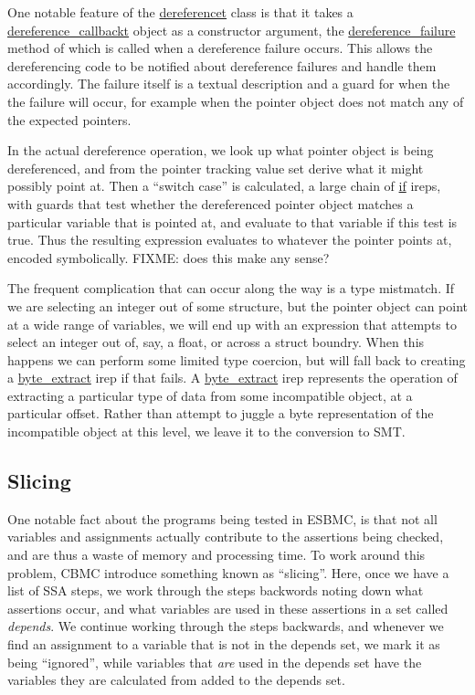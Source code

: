 \documentclass{article}
\begin{document}
One notable feature of the \url{dereferencet} class is that it takes a
\url{dereference_callbackt} object as a constructor argument, the
\url{dereference_failure} method of which is called when a dereference
failure occurs. This allows the dereferencing code to be notified about
dereference failures and handle them accordingly. The failure itself
is a textual description and a guard for when the the failure will occur,
for example when the pointer object does not match any of the expected
pointers.

In the actual dereference operation, we look up what pointer object is being
dereferenced, and from the pointer tracking value set derive what it might
possibly point at. Then a ``switch case'' is calculated, a large chain of
\url{if} ireps, with guards that test whether the dereferenced pointer object
matches a particular variable that is pointed at, and evaluate to that variable
if this test is true. Thus the resulting expression evaluates to whatever
the pointer points at, encoded symbolically. FIXME: does this make any sense?

The frequent complication that can occur along the way is a type mistmatch.
If we are selecting an integer out of some structure, but the pointer object
can point at a wide range of variables, we will end up with an expression
that attempts to select an integer out of, say, a float, or across a struct
boundry. When this happens we can perform some limited type coercion, but
will fall back to creating a \url{byte_extract} irep if that fails. A
\url{byte_extract} irep represents the operation of extracting a particular
type of data from some incompatible object, at a particular offset. Rather than
attempt to juggle a byte representation of the incompatible object at this
level, we leave it to the conversion to SMT.

\subsection{Slicing}

One notable fact about the programs being tested in ESBMC, is that not all
variables and assignments actually contribute to the assertions being checked,
and are thus a waste of memory and processing time. To work around this problem,
CBMC introduce something known as ``slicing''. Here, once we have a list of
SSA steps, we work through the steps backwords noting down what assertions
occur, and what variables are used in these assertions in a set called
\textit{depends}. We continue working through the steps backwards, and whenever
we find an assignment to a variable that is not in the depends set,
we mark it as being ``ignored'', while variables that \textit{are} used in the
depends set have the variables they are calculated from added to the depends
set.
\end{document}
